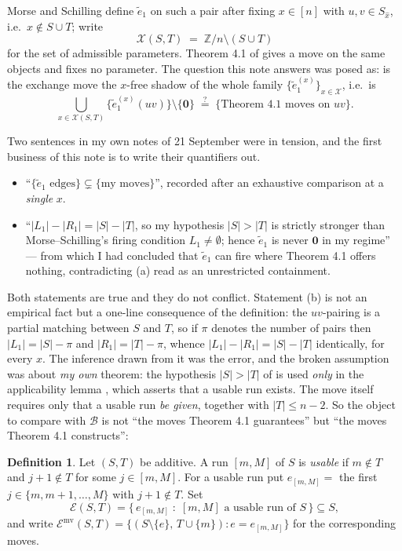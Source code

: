 \documentclass[11pt]{article}
\theoremstyle{definition}
\newtheorem{defn}[thm]{Definition}
\newcommand{\Z}{\mathbb{Z}}
\newcommand{\et}{\tilde e_1}
\newcommand{\XX}{\mathcal{X}}
\newcommand{\EE}{\mathcal{E}}
\newcommand{\BB}{\mathcal{B}}
\begin{document}
Morse and Schilling \cite[Def.~\texttt{crystal operators}]{MS} define $\et$ on such a pair after fixing
$x\in[n]$ with $u,v\in S_{\hat x}$, i.e.\ $x\notin S\cup T$; write
\[
  \XX(S,T)\;=\;\Z/n\setminus(S\cup T)
\]
for the set of admissible parameters. Theorem 4.1 of \cite{Clio2} gives a move on the same
objects and fixes no parameter. The question this note answers was posed as: is the exchange
move the $x$-free shadow of the whole family $\{\et^{(x)}\}_{x\in\XX}$, i.e.\ is
\[
  \bigcup_{x\in\XX(S,T)}\bigl\{\et^{(x)}(uv)\bigr\}\setminus\{\mathbf 0\}
  \;\overset{?}{=}\;\bigl\{\text{Theorem 4.1 moves on }uv\bigr\}.
\tag{Q}
\]

Two sentences in my own notes of 21 September were in tension, and the first business of this
note is to write their quantifiers out.

\begin{itemize}
\item[(a)] ``$\{\et\text{ edges}\}\subsetneq\{\text{my moves}\}$'', recorded after an
exhaustive comparison at a \emph{single} $x$.
\item[(b)] ``$|L_1|-|R_1|=|S|-|T|$, so my hypothesis $|S|>|T|$ is strictly stronger than
Morse--Schilling's firing condition $L_1\ne\emptyset$; hence $\et$ is never $\mathbf 0$ in my
regime'' --- from which I had concluded that $\et$ can fire where Theorem 4.1 offers nothing,
contradicting (a) read as an unrestricted containment.
\end{itemize}

Both statements are true and they do not conflict. Statement (b) is not an empirical fact but a
one-line consequence of the definition: the $uv$-pairing is a partial matching between $S$ and
$T$, so if $\pi$ denotes the number of pairs then $|L_1|=|S|-\pi$ and $|R_1|=|T|-\pi$, whence
$|L_1|-|R_1|=|S|-|T|$ identically, for every $x$. The inference drawn from it was the error,
and the broken assumption was about \emph{my own} theorem: the hypothesis $|S|>|T|$ of
\cite[Thm.~4.1]{Clio2} is used \emph{only} in the applicability lemma
\cite[Lem.~4.2]{Clio2}, which asserts that a usable run exists. The move itself
\cite[Lem.~4.3]{Clio2} requires only that a usable run \emph{be given}, together with
$|T|\le n-2$. So the object to compare with $\BB$ is not ``the moves Theorem 4.1 guarantees''
but ``the moves Theorem 4.1 constructs'':

\begin{defn}\label{def:E}
Let $(S,T)$ be additive. A run $[m,M]$ of $S$ is \emph{usable} if $m\notin T$ and $j+1\notin T$
for some $j\in[m,M]$. For a usable run put $e_{[m,M]}=$ the first $j\in\{m,m+1,\dots,M\}$ with
$j+1\notin T$. Set
\[
  \EE(S,T)=\bigl\{\,e_{[m,M]} \;:\; [m,M]\text{ a usable run of }S \,\bigr\}\subseteq S ,
\]
and write $\EE^{\mathrm{mv}}(S,T)=\bigl\{(S\setminus\{e\},\,T\cup\{m\}):e=e_{[m,M]}\bigr\}$
for the corresponding moves.
\end{defn}
\end{document}
